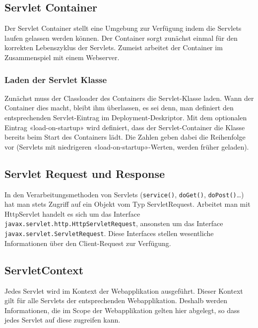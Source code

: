 \subsection{Servlet Container}
Der Servlet Container stellt eine Umgebung zur Verfügung indem die Servlets laufen gelassen werden können. Der Container sorgt zunächst einmal für den korrekten Lebenszyklus der Servlets. Zumeist arbeitet der Container im Zusammenspiel mit einem Webserver.

\subsubsection{Laden der Servlet Klasse}
Zunächst muss der Classloader des Containers die Servlet-Klasse laden. Wann der Container dies macht, bleibt ihm überlassen, es sei denn, man definiert den entsprechenden Servlet-Eintrag im Deployment-Deskriptor. Mit dem optionalen Eintrag «load-on-startup» wird definiert, dass der Servlet-Container die Klasse bereits beim Start des Containers lädt. Die Zahlen geben dabei die Reihenfolge vor (Servlets mit niedrigeren «load-on-startup»-Werten, werden früher geladen).

\subsection{Servlet Request und Response}
In den Verarbeitungsmethoden von Servlets (\texttt{service()}, \texttt{doGet()}, \texttt{doPost()}…) hat man stets Zugriff auf ein Objekt vom Typ ServletRequest. Arbeitet man mit HttpServlet handelt es sich um das Interface  \texttt{javax.servlet.http.HttpServletRequest}, ansonsten um das Interface \texttt{javax.servlet.ServletRequest}. Diese Interfaces stellen wesentliche Informationen über den Client-Request zur Verfügung.
\subsection{ServletContext}
Jedes Servlet wird im Kontext der Webapplikation ausgeführt. Dieser Kontext gilt für alle Servlets der entsprechenden Webapplikation. Deshalb werden Informationen, die im Scope der Webapplikation gelten hier abgelegt, so dass jedes Servlet auf diese zugreifen kann.

